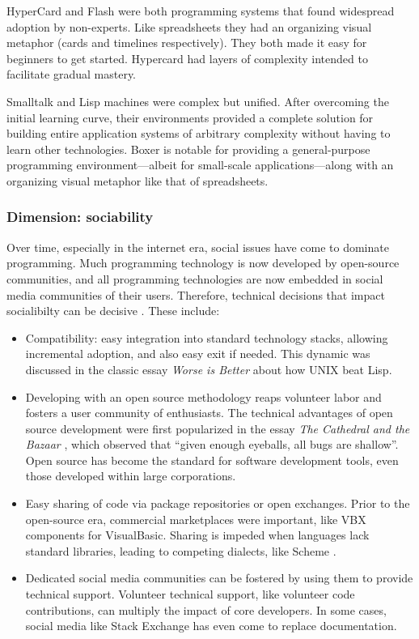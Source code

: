 \documentclass[english,submission]{programming}
\begin{document}
HyperCard and Flash were both programming systems that found widespread
adoption by non-experts. Like spreadsheets they had an organizing visual
metaphor (cards and timelines respectively). They both made it easy for
beginners to get started. Hypercard had layers of complexity intended to
facilitate gradual mastery.

Smalltalk and Lisp machines were complex but unified. After overcoming
the initial learning curve, their environments provided a complete
solution for building entire application systems of arbitrary complexity
without having to learn other technologies. Boxer \cite{BoxerDesign} is
notable for providing a general-purpose programming environment---albeit
for small-scale applications---along with an organizing visual metaphor
like that of spreadsheets.

\hypertarget{dimension-sociability}{%
\subsubsection{Dimension: sociability}\label{dimension-sociability}}

Over time, especially in the internet era, social issues have come to
dominate programming. Much programming technology is now developed by
open-source communities, and all programming technologies are now
embedded in social media communities of their users. Therefore,
technical decisions that impact socialibilty can be decisive
\cite{SocioPLT}. These include:

\begin{itemize}
\tightlist
\item
  Compatibility: easy integration into standard technology stacks,
  allowing incremental adoption, and also easy exit if needed. This
  dynamic was discussed in the classic essay \emph{Worse is Better}
  \cite{WIB} about how UNIX beat Lisp.
\item
  Developing with an open source methodology reaps volunteer labor and
  fosters a user community of enthusiasts. The technical advantages of
  open source development were first popularized in the essay \emph{The
  Cathedral and the Bazaar} \cite{Cathedral}, which observed that
  ``given enough eyeballs, all bugs are shallow''. Open source has
  become the standard for software development tools, even those
  developed within large corporations.
\item
  Easy sharing of code via package repositories or open exchanges. Prior
  to the open-source era, commercial marketplaces were important, like
  VBX components for VisualBasic. Sharing is impeded when languages lack
  standard libraries, leading to competing dialects, like Scheme
  \cite{LispCurse}.
\item
  Dedicated social media communities can be fostered by using them to
  provide technical support. Volunteer technical support, like volunteer
  code contributions, can multiply the impact of core developers. In
  some cases, social media like Stack Exchange has even come to replace
  documentation.
\end{itemize}
\end{document}
